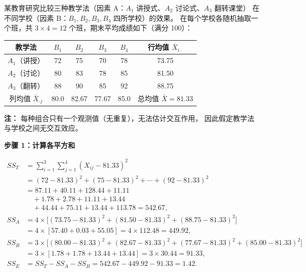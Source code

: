 \begin{example}
某教育研究比较三种教学法（因素 A：$A_1$ 讲授式、$A_2$ 讨论式、$A_3$ 翻转课堂）
在不同学校（因素 B：$B_1, B_2, B_3, B_4$ 四所学校）的效果。
在每个学校各随机抽取一个班，共 $3 \times 4 = 12$ 个班，期末平均成绩如下（满分 100）：

\begin{center}
\begin{tabular}{c|cccc|c}
    \toprule
    教学法 & $B_1$ & $B_2$ & $B_3$ & $B_4$ & 行均值 $\bar{X}_{i\cdot}$ \\
    \midrule
    $A_1$（讲授）  & 72 & 75 & 70 & 78 & 73.75 \\
    $A_2$（讨论）  & 80 & 83 & 78 & 85 & 81.50 \\
    $A_3$（翻转）  & 88 & 90 & 85 & 92 & 88.75 \\
    \midrule
    列均值 $\bar{X}_{\cdot j}$ & 80.0 & 82.67 & 77.67 & 85.0 & 总均值 $\bar{X}=81.33$ \\
    \bottomrule
\end{tabular}
\end{center}

\textbf{注：} 每种组合只有一个观测值（无重复），无法估计交互作用，
因此假定教学法与学校之间无交互效应。

\medskip
\textbf{步骤 1：计算各平方和}

\begin{align}
    SS_T &= \sum_{i=1}^{3}\sum_{j=1}^{4} (X_{ij} - 81.33)^2 \\
         &= (72-81.33)^2 + (75-81.33)^2 + \cdots + (92-81.33)^2 \\
         &= 87.11 + 40.11 + 128.44 + 11.11 \\
         &\quad + 1.78 + 2.78 + 11.11 + 13.44 \\
         &\quad + 44.44 + 75.11 + 13.44 + 113.78 = 542.67, \\[4pt]
    SS_A &= 4 \times \bigl[(73.75-81.33)^2 + (81.50-81.33)^2 + (88.75-81.33)^2\bigr] \\
         &= 4 \times [57.40 + 0.03 + 55.05] = 4 \times 112.48 = 449.92, \\[4pt]
    SS_B &= 3 \times \bigl[(80.00-81.33)^2 + (82.67-81.33)^2 + (77.67-81.33)^2 + (85.00-81.33)^2\bigr] \\
         &= 3 \times [1.78 + 1.78 + 13.44 + 13.44] = 3 \times 30.44 = 91.33, \\[4pt]
    SS_E &= SS_T - SS_A - SS_B = 542.67 - 449.92 - 91.33 = 1.42.
\end{align}


\end{example}
